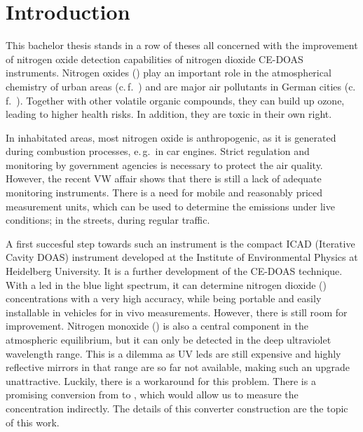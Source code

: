 \section{Introduction}
\label{sec:intro}

This bachelor thesis stands in a row of theses all concerned with the
improvement of nitrogen oxide detection capabilities of nitrogen
dioxide CE-DOAS instruments. Nitrogen oxides () play an
important role in the atmospherical chemistry of urban areas
(c.\,f.~\cite{roedel}) and are major air pollutants in German cities
(c.\,f.~\cite{no2schadstoff,who}). Together with other volatile
organic compounds, they can build up ozone, leading to higher health
risks. In addition, they are toxic in their own right.

In inhabitated areas, most nitrogen oxide is anthropogenic, as it is
generated during combustion processes, e.\,g.\ in car engines. Strict
regulation and monitoring by government agencies is necessary to
protect the air quality. However, the recent VW affair shows that
there is still a lack of adequate monitoring instruments. There is a
need for mobile and reasonably priced measurement units, which can be
used to determine the  emissions under live conditions; in
the streets, during regular traffic.

A first succesful step towards such an instrument is the compact
 ICAD (Iterative Cavity DOAS)
instrument developed at the Institute of Environmental Physics at
Heidelberg University. It is a further development of the CE-DOAS
technique. With a led in the blue light spectrum, it can determine
nitrogen dioxide () concentrations with a very high accuracy,
while being portable and easily installable in vehicles for in vivo
measurements. However, there is still room for improvement. Nitrogen
monoxide () is also a central component in the atmospheric
 equilibrium, but it can only be detected in the deep
ultraviolet wavelength range. This is a dilemma as UV leds are still
expensive and highly reflective mirrors in that range are so far not
available, making such an upgrade unattractive. Luckily, there is a
workaround for this problem. There is a promising conversion from
 to , which would allow us to measure the concentration
indirectly. The details of this converter construction are the topic
of this work.

